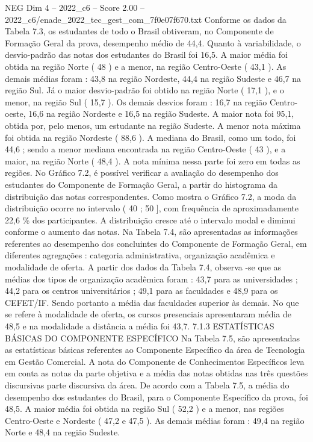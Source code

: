 \begin{textsample}{NEG Dim 4 – 2022\_c6 – Score 2.00 – 2022\_c6/enade\_2022\_tec\_gest\_com\_7f0e07f670.txt}
Conforme os dados da Tabela 7.3, os estudantes de todo o Brasil obtiveram, no Componente de Formação Geral da prova, desempenho médio de 44,4.
Quanto à variabilidade, o desvio-padrão das notas dos estudantes do Brasil foi 16,5.
A maior média foi obtida na região Norte ( 48 ) e a menor, na região Centro-Oeste ( 43,1 ).
As demais médias foram : 43,8 na região Nordeste, 44,4 na região Sudeste e 46,7 na região Sul.
Já o maior desvio-padrão foi obtido na região Norte ( 17,1 ), e o menor, na região Sul ( 15,7 ).
Os demais desvios foram : 16,7 na região Centro-oeste, 16,6 na região Nordeste e 16,5 na região Sudeste.
A maior nota foi 95,1, obtida por, pelo menos, um estudante na região Sudeste.
A menor nota máxima foi obtida na região Nordeste ( 88,6 ).
A mediana do Brasil, como um todo, foi 44,6 ; sendo a menor mediana encontrada na região Centro-Oeste ( 43 ), e a maior, na região Norte ( 48,4 ).
A nota mínima nessa parte foi zero em todas as regiões.
No Gráfico 7.2, é possível verificar a avaliação do desempenho dos estudantes do Componente de Formação Geral, a partir do histograma da distribuição das notas correspondentes.
Como mostra o Gráfico 7.2, a moda da distribuição ocorre no intervalo ( 40 ; 50 ], com frequência de aproximadamente 22,6 \% dos participantes.
A distribuição cresce até o intervalo modal e diminui conforme o aumento das notas.
Na Tabela 7.4, são apresentadas as informações referentes ao desempenho dos concluintes do Componente de Formação Geral, em diferentes agregações : categoria administrativa, organização acadêmica e modalidade de oferta.
A partir dos dados da Tabela 7.4, observa -se que as médias dos tipos de organização acadêmica foram : 43,7 para as universidades ; 44,2 para os centros universitários ; 49,1 para as faculdades e 48,9 para os CEFET/IF.
Sendo portanto a média das faculdades superior às demais.
No que se refere à modalidade de oferta, os cursos presenciais apresentaram média de 48,5 e na modalidade a distância a média foi 43,7. 7.1.3 ESTATÍSTICAS BÁSICAS DO COMPONENTE ESPECÍFICO Na Tabela 7.5, são apresentadas as estatísticas básicas referentes ao Componente Específico da área de Tecnologia em Gestão Comercial.
A nota do Componente de Conhecimentos Específicos leva em conta as notas da parte objetiva e a média das notas obtidas nas três questões discursivas parte discursiva da área.
De acordo com a Tabela 7.5, a média do desempenho dos estudantes do Brasil, para o Componente Específico da prova, foi 48,5.
A maior média foi obtida na região Sul ( 52,2 ) e a menor, nas regiões Centro-Oeste e Nordeste ( 47,2 e 47,5 ).
As demais médias foram : 49,4 na região Norte e 48,4 na região Sudeste.

\end{textsample}
